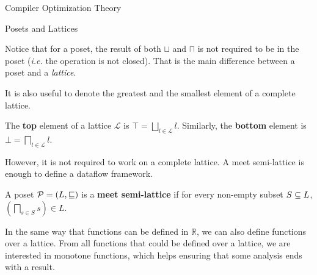 \begin{section}{Compiler Optimization Theory}
\begin{subsection}{Posets and Lattices}
%

Notice that for a poset, the result of both $\sqcup$ and $\sqcap$ is not
required to be in the poset (\textit{i.e.} the operation is not closed).
That is the main difference between a poset and a \textit{lattice}.

%

It is also useful to denote the greatest and the smallest element of a complete lattice.

\begin{definition}
	The \textbf{top} element of a lattice $\mathcal{L}$ is $\top = \bigsqcup_{l \in \mathcal{L}} l$. Similarly, the \textbf{bottom} element is $\bot = \bigsqcap_{l \in \mathcal{L}} l$.
\end{definition}

However, it is not required to work on a complete lattice. A meet semi-lattice is
enough to define a dataflow framework.

\begin{definition}
	A poset $\mathcal{P} = (L, \sqsubseteq)$ is a \textbf{meet semi-lattice} if
	for every non-empty subset $S \subseteq L$, $\left(\bigsqcap_{s \in S} s \right) \in L$.
\end{definition}


In the same way that functions can be defined in $\mathbb{R}$, we can also
define functions over a lattice. From all functions that could be defined
over a lattice, we are interested in monotone functions, which helps ensuring
that some analysis ends with a result.


\end{subsection}
\end{section}
